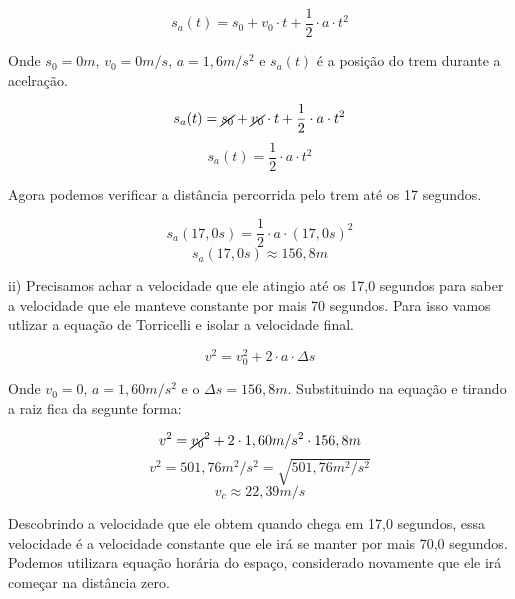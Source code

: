 \documentclass[a4paper, 12pt]{article}
\begin{document}
\begin{flushleft}
		\begin{equation*}
			s_a(t) = s_0 + v_0 \cdot t + \frac{1}{2} \cdot a \cdot t^2
		\end{equation*}
		
		Onde $s_0 = 0m$, $v_0 = 0m/s$, $a = 1,6m/s^2$ e $s_a(t)$ é a posição do trem durante a acelração.
		
		\begin{equation*}
			s_a(t) = \cancel{s_0} + \cancel{v_0} \cdot t + \frac{1}{2} \cdot a \cdot t^2
		\end{equation*}
		\begin{equation*}
			s_a(t) =\frac{1}{2} \cdot a \cdot t^2
		\end{equation*}
		
		Agora podemos verificar a distância percorrida pelo trem até os 17 segundos.
		
		\begin{equation*}
			s_a(17,0s) =\frac{1}{2} \cdot a \cdot (17,0s)^2
		\end{equation*}
		\begin{equation*}
			s_a(17,0s) \approx 156,8m
		\end{equation*}
		
		ii) Precisamos achar a velocidade que ele atingio até os 17,0 segundos para saber a velocidade que ele manteve constante por mais 70 segundos. Para isso vamos utlizar a equação de Torricelli e isolar a velocidade final.
		
		\begin{equation*}
			v^2 = v_0^2 + 2 \cdot a \cdot \Delta{s}
		\end{equation*}
		
		Onde $v_0=0$, $a=1,60m/s^2$ e o $\Delta{s} = 156,8m$. Substituindo na equação e tirando a raiz fica da segunte forma:
		
		\begin{equation*}
			v^2 = \cancel{v_0}^2 + 2 \cdot 1,60m/s^2 \cdot 156,8m
		\end{equation*}
		\begin{equation*}
			v^2 = 501,76m^2/s^2 = \sqrt{501,76m^2/s^2}
		\end{equation*}
		\begin{equation*}
			v_c \approx 22,39m/s  
		\end{equation*}
		
		Descobrindo a velocidade que ele obtem quando chega em 17,0 segundos, essa velocidade é a velocidade constante que ele irá se manter por mais 70,0 segundos. Podemos utilizara equação horária do espaço, considerado novamente que ele irá começar na distância zero.
		

\end{flushleft}
\end{document}
